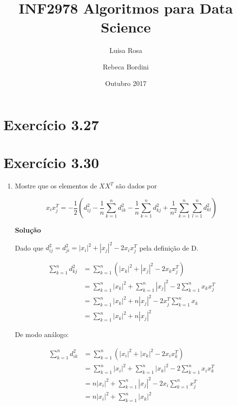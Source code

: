 \documentclass{article}
\author{
  Luisa Rosa
  \and
  Rebeca Bordini
}
\title{INF2978 Algoritmos para Data Science}
\date{Outubro 2017}
\begin{document}
\maketitle

\section{Exercício 3.27}
\section{Exercício 3.30}

\begin{enumerate}
    \item Mostre que os elementos de $XX^{T}$ são dados por
 
 \begin{equation} \label{eq:1}
    x_{i}x_{j}^{T} = -\frac{1}{2}
    \left(d_{{i}{j}}^{2} - \frac{1}{n}\sum_{k=1}^{n}d_{{i}{k}}^{2} -
    \frac{1}{n}\sum_{k=1}^{n}d_{{k}{j}}^{2} +
    \frac{1}{n^2}\sum_{k=1}^{n}\sum_{l=1}^{n}d_{{k}{l}}^{2}\right) 
\end{equation}

    \textbf{Solução}
    
    Dado que \(d_{{i}{j}}^{2} = d_{{j}{i}}^{2} = | x_{i}|^{2} + |x_{j}|^{2} -2x_{i}x_{j}^{T} \) pela definição de D.
    
\begin{equation} \label{eq:2}
\begin{split}
    \sum_{k=1}^{n}d_{{k}{j}}^2 & = 
    \sum_{k=1}^{n} \left(| x_{k}|^{2} + |x_{j}|^{2} -2x_{k}x_{j}^{T} \right) \\ 
    & = \sum_{k=1}^{n}|x_{k}|^{2} + \sum_{k=1}^{n}|x_{j}|^{2} -2 \sum_{k=1}^{n}x_{k}x_{j}^{T}  \\
    & = \sum_{k=1}^{n}|x_{k}|^{2} + n|x_{j}|^{2} -2x_{j}^{T} \sum_{k=1}^{n}x_{k} \\
    & = \sum_{k=1}^{n}|x_{k}|^{2} + n|x_{j}|^{2}
\end{split}
\end{equation}

De modo análogo:

\begin{equation} \label{eq:3}
\begin{split}
    \sum_{k=1}^{n}d_{{i}{k}}^2 & = 
    \sum_{k=1}^{n} \left(| x_{i}|^{2} + |x_{k}|^{2} -2x_{i}x_{k}^{T} \right) \\ 
    & = \sum_{k=1}^{n}|x_{i}|^{2} + \sum_{k=1}^{n}|x_{k}|^{2} -2 \sum_{k=1}^{n}x_{i}x_{k}^{T}  \\
    & = n|x_{i}|^{2} + \sum_{k=1}^{n}|x_{j}|^{2} -2x_{i} \sum_{k=1}^{n}x_{j}^{T} \\
    & = n|x_{i}|^{2} + \sum_{k=1}^{n}|x_{k}|^{2} 
\end{split}
\end{equation}


\end{enumerate}
\end{document}
